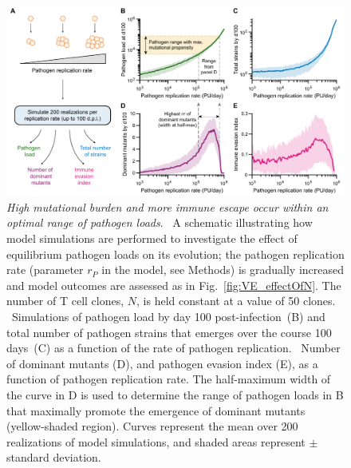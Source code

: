 \begin{figure}[b!]
    \centering
    \includegraphics[width=\textwidth]{Figures/VE/fig5_effectOfBeta.pdf}
    \caption[High mutational burden and more immune escape occur within an optimal range of pathogen loads]{\textit{High mutational burden and more immune escape occur within an optimal range of pathogen loads}. %
    ~A schematic illustrating how model simulations are performed to investigate the effect of equilibrium pathogen loads on its evolution; the pathogen replication rate (parameter $r_P$ in the model, see Methods) is gradually increased and model outcomes are assessed as in Fig.~\ref{fig:VE_effectOfN}. The number of T cell clones, $N$, is held constant at a value of 50 clones. %
    ~Simulations of pathogen load by day 100 post-infection~(B) and total number of pathogen strains that emerges over the course 100 days~(C) as a function of the rate of pathogen replication.
    ~Number of dominant mutants (D), and pathogen evasion index (E), as a function of pathogen replication rate. The half-maximum width of the curve in D is used to determine the range of pathogen loads in B that maximally promote the emergence of dominant mutants (yellow-shaded region). Curves represent the mean over 200 realizations of model simulations, and shaded areas represent $\pm$ standard deviation.}
    \label{fig:VE_effectOfBeta}
\end{figure}

